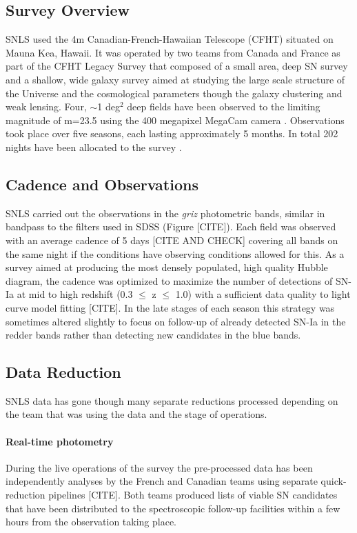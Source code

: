 \subsection{Survey Overview}
SNLS used the 4m Canadian-French-Hawaiian Telescope (CFHT) situated on Mauna Kea, Hawaii. It was operated by two teams from Canada and France as part of the CFHT Legacy Survey that composed of a small area, deep SN survey and a shallow, wide galaxy survey aimed at studying the large scale structure of the Universe and the cosmological parameters though the galaxy clustering and weak lensing. Four, $\sim$1 deg$^2$ deep fields have been observed to the limiting magnitude of m=23.5 using the 400 megapixel MegaCam camera \citep{Boulade2003MegaCam:Camera}. Observations took place over five seasons, each lasting approximately 5 months. In total 202 nights have been allocated to the survey \citep{Pritchet2004SNLSSurvey}.

\subsection{Cadence and Observations}
SNLS carried out the observations in the \textit{griz} photometric bands, similar in bandpass to the filters used in SDSS (Figure [CITE]). Each field was observed with an average cadence of 5 days [CITE AND CHECK] covering all bands on the same night if the conditions have observing conditions allowed for this. As a survey aimed at producing the most densely populated, high quality Hubble diagram, the cadence was optimized to maximize the number of detections of SN-Ia at mid to high redshift (0.3 $\leq$ z $\leq$ 1.0) with a sufficient data quality to light curve model fitting [CITE]. In the late stages of each season this strategy was sometimes altered slightly to focus on follow-up of already detected SN-Ia in the redder bands rather than detecting new candidates in the blue bands. 

\subsection{Data Reduction}
SNLS data has gone though many separate reductions processed depending on the team that was using the data and the stage of operations. 

\paragraph{Real-time photometry}
During the live operations of the survey the pre-processed data has been independently analyses by the French and Canadian teams using separate quick-reduction pipelines [CITE]. Both teams produced lists of viable SN candidates that have been distributed to the spectroscopic follow-up facilities within a few hours from the observation taking place. 

